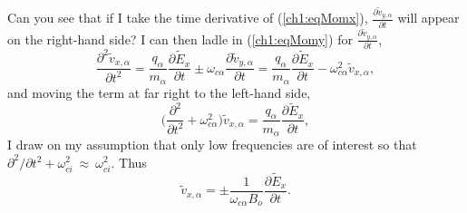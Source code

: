 Can you see that if I take the time derivative of (\ref{ch1:eqMomx}),
$\frac{\partial \tilde v_{y,\alpha}}{\partial t}$ will appear on the right-hand side?
I can then ladle in (\ref{ch1:eqMomy}) for $\frac{\partial
  \tilde v_{y,\alpha}}{\partial t}$,
\begin{equation*} \label{ch1:eqMomxdt} \dfrac{\partial^2 \tilde v_{x,\alpha}}{\partial
    t^2} = \dfrac{q_\alpha}{m_\alpha}\dfrac{\partial \tilde E_x}{\partial t} \pm
  \omega_{c \alpha} \dfrac{\partial \tilde v_{y,\alpha}}{\partial t} =
  \dfrac{q_\alpha}{m_\alpha}\dfrac{\partial \tilde E_x}{\partial t} - \omega_{c
    \alpha}^2 \tilde v_{x,\alpha},
\end{equation*}
and moving the term at far right to the left-hand side,
\begin{equation*} \Big ( \dfrac{\partial^2}{\partial t^2} + \omega_{c \alpha}^2
  \Big ) \tilde v_{x,\alpha} = \dfrac{q_\alpha}{m_\alpha}\dfrac{\partial \tilde E_x}{\partial
    t},
\end{equation*}
I draw on my assumption that only low frequencies are of interest so that
$\partial^2 / \partial t^2 + \omega_{c i}^2~\approx~\omega_{c i}^2$. Thus
\begin{equation} \label{ch1:eqvxEx}
  \tilde v_{x,\alpha} = \pm \dfrac{1}{\omega_{c \alpha} B_o}\dfrac{\partial
    \tilde E_x}{\partial t}.
\end{equation}

